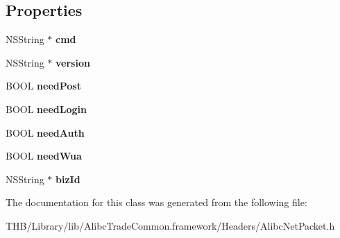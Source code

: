 \subsection*{Properties}
\begin{DoxyCompactItemize}
\item 
\mbox{\label{interface_alibc_net_packet_http_header_ab014f251be3254d5bd36dbd8a4c60c98}} 
N\+S\+String $\ast$ {\bfseries cmd}
\item 
\mbox{\label{interface_alibc_net_packet_http_header_a193d607c91963a3f66abe037cfa784ed}} 
N\+S\+String $\ast$ {\bfseries version}
\item 
\mbox{\label{interface_alibc_net_packet_http_header_a2cc250024df3947afa120210f85f2313}} 
B\+O\+OL {\bfseries need\+Post}
\item 
\mbox{\label{interface_alibc_net_packet_http_header_a47ca5434fc606208e8a4c6313fb85bfd}} 
B\+O\+OL {\bfseries need\+Login}
\item 
\mbox{\label{interface_alibc_net_packet_http_header_ab5a8fd86b65463acb857678d68f4ab8d}} 
B\+O\+OL {\bfseries need\+Auth}
\item 
\mbox{\label{interface_alibc_net_packet_http_header_ac0939cfdc15bff16d899905999ece28b}} 
B\+O\+OL {\bfseries need\+Wua}
\item 
\mbox{\label{interface_alibc_net_packet_http_header_a5970c1672cf95a18cc5756b7a687861b}} 
N\+S\+String $\ast$ {\bfseries biz\+Id}
\end{DoxyCompactItemize}


The documentation for this class was generated from the following file\+:\begin{DoxyCompactItemize}
\item 
T\+H\+B/\+Library/lib/\+Alibc\+Trade\+Common.\+framework/\+Headers/Alibc\+Net\+Packet.\+h\end{DoxyCompactItemize}
